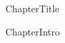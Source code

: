 \documentclass[main.tex]{subfiles}
\newcommand\chapterlabel{Ch-solids}\setcounter{figurenewcounter}{0}\setcounter{tablenewcounter}{0}\setcounter{formulanewcounter}{0}\chapterpicture{../{\chapterlabel}/figure1}\chapterpicturelabel{PxFuel}
\begin{document}
    

{ChapterTitle}
 


{ChapterIntro}

%
%
\end{document}
